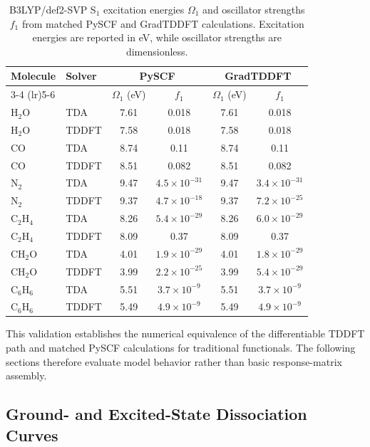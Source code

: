 \begin{table}[t]
\centering
\caption{B3LYP/def2-SVP S$_1$ excitation energies \(\Omega_1\) and
oscillator strengths \(f_1\) from matched PySCF and GradTDDFT
calculations. Excitation energies are reported in eV, while oscillator
strengths are dimensionless.}
\label{tab:b3lyp-s1-excitation-oscillator}
\begin{tabular}{llcccc}
\toprule
\multirow{2}{*}{Molecule} & \multirow{2}{*}{Solver} &
\multicolumn{2}{c}{PySCF} & \multicolumn{2}{c}{GradTDDFT} \\
\cmidrule(lr){3-4} \cmidrule(lr){5-6}
 & & \(\Omega_1\) (eV) & \(f_1\) & \(\Omega_1\) (eV) & \(f_1\) \\
\midrule
H$_2$O & TDA & 7.61 & 0.018 & 7.61 & 0.018 \\
H$_2$O & TDDFT & 7.58 & 0.018 & 7.58 & 0.018 \\
CO & TDA & 8.74 & 0.11 & 8.74 & 0.11 \\
CO & TDDFT & 8.51 & 0.082 & 8.51 & 0.082 \\
N$_2$ & TDA & 9.47 & \(4.5\times 10^{-31}\) & 9.47 & \(3.4\times 10^{-31}\) \\
N$_2$ & TDDFT & 9.37 & \(4.7\times 10^{-18}\) & 9.37 & \(7.2\times 10^{-25}\) \\
C$_2$H$_4$ & TDA & 8.26 & \(5.4\times 10^{-29}\) & 8.26 & \(6.0\times 10^{-29}\) \\
C$_2$H$_4$ & TDDFT & 8.09 & 0.37 & 8.09 & 0.37 \\
CH$_2$O & TDA & 4.01 & \(1.9\times 10^{-29}\) & 4.01 & \(1.8\times 10^{-29}\) \\
CH$_2$O & TDDFT & 3.99 & \(2.2\times 10^{-25}\) & 3.99 & \(5.4\times 10^{-29}\) \\
C$_6$H$_6$ & TDA & 5.51 & \(3.7\times 10^{-9}\) & 5.51 & \(3.7\times 10^{-9}\) \\
C$_6$H$_6$ & TDDFT & 5.49 & \(4.9\times 10^{-9}\) & 5.49 & \(4.9\times 10^{-9}\) \\
\bottomrule
\end{tabular}
\end{table}

This validation establishes the numerical equivalence of the
differentiable TDDFT path and matched PySCF calculations for
traditional functionals. The following sections therefore evaluate
model behavior rather than basic response-matrix assembly.

\subsection{\texorpdfstring{Ground- and Excited-State Dissociation Curves}{Ground- and Excited-State Dissociation Curves}}
\label{sec:eval-dissociation}
\label{sec:eval-ground-dissociation}
\label{sec:eval-excited-dissociation}

